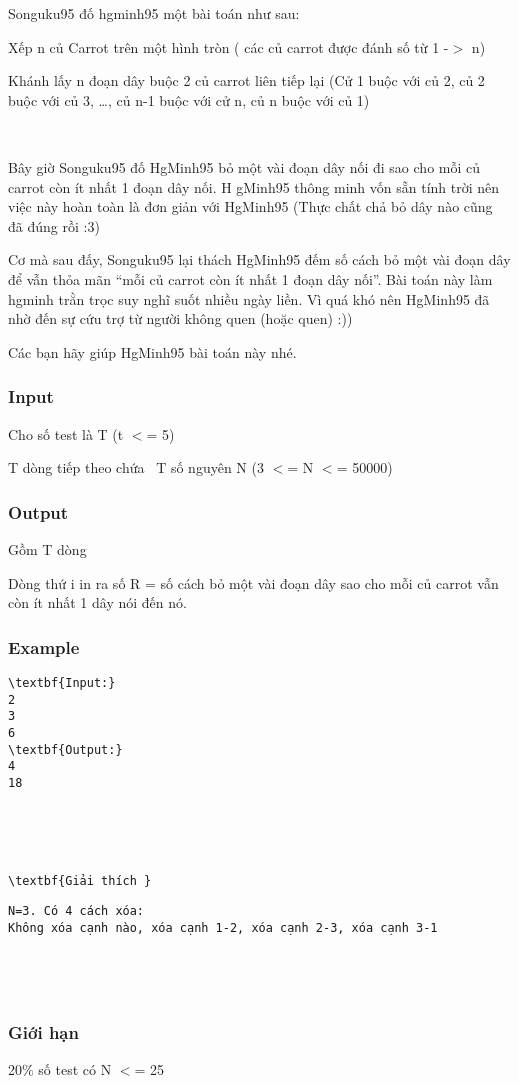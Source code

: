 

Songuku95 đố hgminh95 một bài toán như sau:

Xếp n củ Carrot trên một hình tròn ( các củ carrot được đánh số từ 1 -$>$ n)

Khánh lấy n đoạn dây buộc 2 củ carrot liên tiếp lại (Cử 1 buộc với củ 2, củ 2 buộc với củ 3, …, củ n-1 buộc với cử n, củ n buộc với củ 1)

 

Bây giờ Songuku95 đố HgMinh95 bỏ một vài đoạn dây nối đi sao cho mỗi củ carrot còn ít nhất 1 đoạn dây nối. H gMinh95 thông minh vốn sẵn tính trời nên việc này hoàn toàn là đơn giản với HgMinh95 (Thực chất chả bỏ dây nào cũng đã đúng rồi :3)

Cơ mà sau đấy, Songuku95 lại thách HgMinh95 đếm số cách bỏ một vài đoạn dây để vẫn thỏa mãn “mỗi củ carrot còn ít nhất 1 đoạn dây nối”. Bài toán này làm hgminh trằn trọc suy nghĩ suốt nhiều ngày liền. Vì quá khó nên HgMinh95 đã nhờ đến sự cứu trợ từ người không quen (hoặc quen) :))

Các bạn hãy giúp HgMinh95 bài toán này nhé.

\subsubsection{Input}

Cho số test là T (t $<$= 5)

T dòng tiếp theo chứa  T số nguyên N (3 $<$= N $<$= 50000)

\subsubsection{Output}

Gồm T dòng

Dòng thứ i in ra số R = số cách bỏ một vài đoạn dây sao cho mỗi củ carrot vẫn còn ít nhất 1 dây nói đến nó.

\subsubsection{Example}
\begin{verbatim}
\textbf{Input:}
2
3
6
\textbf{Output:}  
4
18\end{verbatim}

 

 
\begin{verbatim}
\textbf{Giải thích }\end{verbatim}
\begin{verbatim}
N=3. Có 4 cách xóa:
Không xóa cạnh nào, xóa cạnh 1-2, xóa cạnh 2-3, xóa cạnh 3-1 \end{verbatim}
\begin{verbatim}
 \end{verbatim}
\begin{verbatim}
 \end{verbatim}

\subsubsection{Giới hạn}

20\% số test có N $<$= 25  